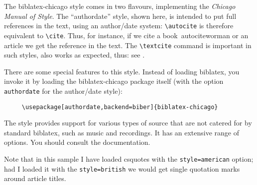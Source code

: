 
\usepackage[style=american]{csquotes}
\usepackage[american]{babel}
\usepackage[authordate,backend=biber]{biblatex-chicago}

\renewcommand{\showingstyle}{chicago author/date}

%
\noindent The \textsf{biblatex-chicago} style comes in two flavours, implementing the \emph{Chicago Manual of Style}. The \enquote{authordate} style, shown here, is intended to put full references in the text, using an author/date system: \verb|\autocite| is therefore equivalent to \verb|\cite|. Thus, for instance, if we cite a book\ autocite{worman} or an article \autocite{reese} we get the reference in the text. The \verb|\textcite| command is important in such styles, also works as expected, thus: see \textcite{worman}.

\quad There are some special features to this style. Instead of loading \textsf{biblatex}, you invoke it by loading the \textsf{biblatex-chicago} package itself (with the option \verb|authordate| for the author/date style):
\begin{verbatim}
     \usepackage[authordate,backend=biber]{biblatex-chicago}
\end{verbatim}
The style provides support for various types of source that are not catered for by standard \textsf{biblatex}, such as music and recordings. It has an extensive range of options. You should consult the documentation.

Note that in this sample I have loaded \textsf{csquotes} with the \verb~style=american~ option; had I loaded it with the \verb~style=british~ we would get single quotation marks around article titles.





